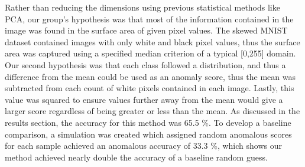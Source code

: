 Rather than reducing the dimensions using previous statistical methods like PCA, our group’s hypothesis
was that most of the information contained in the image was found in the surface area of given pixel
values. The skewed MNIST dataset contained images with only white and black pixel values, thus the
surface area was captured using a specified median criterion of a typical [0,255] domain.
Our second hypothesis was that each class followed a distribution, and thus a difference from the mean
could be used as an anomaly score, thus the mean was subtracted from each count of white pixels
contained in each image. Lastly, this value was squared to ensure values further away from the mean
would give a larger score regardless of being greater or less than the mean.
As discussed in the results section, the accuracy for this method was 65.5 \%. To develop a baseline
comparison, a simulation was created which assigned random anomalous scores for each sample
achieved an anomalous accuracy of 33.3 \%, which shows our method achieved nearly double the
accuracy of a baseline random guess.